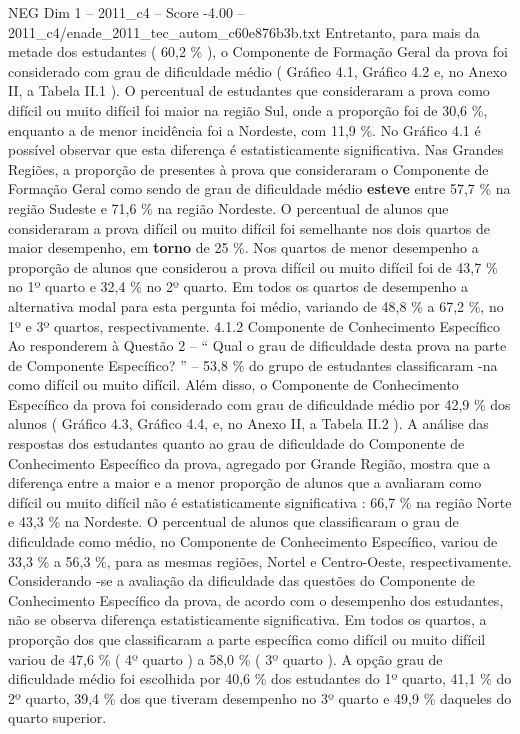 \begin{textsample}{NEG Dim 1 – 2011\_c4 – Score -4.00 – 2011\_c4/enade\_2011\_tec\_autom\_c60e876b3b.txt}
Entretanto, para mais da metade dos estudantes ( 60,2 \% ), o Componente de Formação Geral da prova foi considerado com grau de dificuldade médio ( Gráfico 4.1, Gráfico 4.2 e, no Anexo II, a Tabela II.1 ).
O percentual de estudantes que consideraram a prova como difícil ou muito difícil foi maior na região Sul, onde a proporção foi de 30,6 \%, enquanto a de menor incidência foi a Nordeste, com 11,9 \%.
No Gráfico 4.1 é possível observar que esta diferença é estatisticamente significativa.
Nas Grandes Regiões, a proporção de presentes à prova que consideraram o Componente de Formação Geral como sendo de grau de dificuldade médio \textbf{esteve} entre 57,7 \% na região Sudeste e 71,6 \% na região Nordeste.
O percentual de alunos que consideraram a prova difícil ou muito difícil foi semelhante nos dois quartos de maior desempenho, em \textbf{torno} de 25 \%.
Nos quartos de menor desempenho a proporção de alunos que considerou a prova difícil ou muito difícil foi de 43,7 \% no 1º quarto e 32,4 \% no 2º quarto.
Em todos os quartos de desempenho a alternativa modal para esta pergunta foi médio, variando de 48,8 \% a 67,2 \%, no 1º e 3º quartos, respectivamente. 4.1.2 Componente de Conhecimento Específico Ao responderem à Questão 2 – “ Qual o grau de dificuldade desta prova na parte de Componente Específico? ” – 53,8 \% do grupo de estudantes classificaram -na como difícil ou muito difícil.
Além disso, o Componente de Conhecimento Específico da prova foi considerado com grau de dificuldade médio por 42,9 \% dos alunos ( Gráfico 4.3, Gráfico 4.4, e, no Anexo II, a Tabela II.2 ).
A análise das respostas dos estudantes quanto ao grau de dificuldade do Componente de Conhecimento Específico da prova, agregado por Grande Região, mostra que a diferença entre a maior e a menor proporção de alunos que a avaliaram como difícil ou muito difícil não é estatisticamente significativa : 66,7 \% na região Norte e 43,3 \% na Nordeste.
O percentual de alunos que classificaram o grau de dificuldade como médio, no Componente de Conhecimento Específico, variou de 33,3 \% a 56,3 \%, para as mesmas regiões, Nortel e Centro-Oeste, respectivamente.
Considerando -se a avaliação da dificuldade das questões do Componente de Conhecimento Específico da prova, de acordo com o desempenho dos estudantes, não se observa diferença estatisticamente significativa.
Em todos os quartos, a proporção dos que classificaram a parte específica como difícil ou muito difícil variou de 47,6 \% ( 4º quarto ) a 58,0 \% ( 3º quarto ).
A opção grau de dificuldade médio foi escolhida por 40,6 \% dos estudantes do 1º quarto, 41,1 \% do 2º quarto, 39,4 \% dos que tiveram desempenho no 3º quarto e 49,9 \% daqueles do quarto superior.

\end{textsample}

